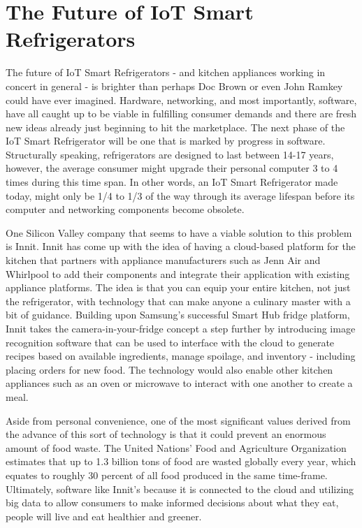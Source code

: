 \documentclass[sigconf]{acmart}
\begin{document}
\section{The Future of IoT Smart Refrigerators}

The future of IoT Smart Refrigerators - and kitchen appliances working in concert in general - is brighter than perhaps Doc Brown or even John Ramkey could have ever imagined. Hardware, networking, and most importantly, software, have all caught up to be viable in fulfilling consumer demands and there are fresh new ideas already just beginning to hit the marketplace. The next phase of the IoT Smart Refrigerator will be one that is marked by progress in software. Structurally speaking, refrigerators are designed to last between 14-17 years\cite{SFGate2017}, however, the average consumer might upgrade their personal computer 3 to 4 times during this time span. In other words, an IoT Smart Refrigerator made today, might only be 1/4 to 1/3 of the way through its average lifespan before its computer and networking components become obsolete. 
\par
One Silicon Valley company that seems to have a viable solution to this problem is Innit\cite{Innit2017}. Innit has come up with the idea of having a cloud-based platform for the kitchen that partners with appliance manufacturers such as Jenn Air and Whirlpool to add their components and integrate their application with existing appliance platforms. The idea is that you can equip your entire kitchen, not just the refrigerator, with technology that can make anyone a culinary master with a bit of guidance\cite{CNBC2017}. Building upon Samsung's successful Smart Hub fridge platform, Innit takes the camera-in-your-fridge concept a step further by introducing image recognition software that can be used to interface with the cloud to generate recipes based on available ingredients, manage spoilage, and inventory - including placing orders for new food. The technology would also enable other kitchen appliances such as an oven or microwave to interact with one another to create a meal. 
\par
Aside from personal convenience, one of the most significant values derived from the advance of this sort of technology is that it could prevent an enormous amount of food waste. The United Nations' Food and Agriculture Organization estimates that up to 1.3 billion tons of food are wasted globally every year\cite{FAO2017}, which equates to roughly 30 percent of all food produced in the same time-frame.  Ultimately, software like Innit's because it is connected to the cloud and utilizing big data to allow consumers to make informed decisions about what they eat, people will live and eat healthier and greener.  
\end{document}
